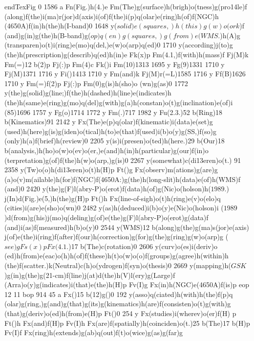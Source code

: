 {{{{{{{{{{{{{{{{{{{{{{{{{{{ endTexFig
 0 1586 a Fn(Fig.)h(4.{)e Fm(The)g(surface)h(brigh)o(tness)g(pro\014le)f
(along)f(the)i(ma)r(jor)d(axis)i(of)f(the)i(p)q(olar)e(ring)h(of)f(NGC)h
(4650A)f(in)h(the)h(I-band)0 1648 y(\(solid)e(squares,)h(this)g(w)o(ork\))f
(and)g(in)g(the)h(B-band)g(\(op)q(en)g(squares,)g(from)e(WMS\).)h(A)g
(transparen)o(t)i(ring)e(mo)q(del,)e(w)o(arp)q(ed)0 1710 y(according)j(to)g
(the)h(prescription)g(describ)q(ed)h(in)e Fk(x)p Fm(4.1,)f(with)h(mass)f
Fj(M)k Fm(=)12 b(2)p Fj(:)p Fm(4)c Fk()i Fm(10)1313 1695
y Fg(9)1331 1710 y Fj(M)1371 1716 y Fi()1413 1710 y Fm(and)k
Fj(M)r(=L)1585 1716 y Ff(B)1626 1710 y Fm(=)f(2)p Fj(:)p Fm(0)g(is)h(sho)o
(wn)g(as)0 1772 y(the)g(solid)g(line;)f(the)h(dashed)h(line)e(indicates)h
(the)h(same)e(ring)g(mo)q(del)g(with)g(a)h(constan)o(t)g(inclination)e(of)i
(85)1696 1757 y Fg(o)1714 1772 y Fm(.)717 1982 y Fu(2.3.)52
b(Ring)18 b(Kinematics)91 2142 y Fx(The)e(p)q(olar)f(kinematic)i(data)e(set)g
(used)h(here)g(is)g(iden)o(tical)h(to)e(that)f(used)i(b)o(y)g(SS,)f(so)g
(only)h(a)f(brief)h(review)0 2205 y(is)i(presen)o(ted)h(here.)29
b(Our)18 b(analysis,)h(ho)o(w)o(ev)o(er,)e(and)h(in)h(particular)g(our)f(in)o
(terpretation)g(of)f(the)h(w)o(arp,)g(is)0 2267 y(somewhat)c(di\013eren)o(t.)
91 2358 y(Tw)o(o)h(di\013eren)o(t)h(H)p Ft()g Fx(observ)m(ations)g(are)g
(a)o(v)m(ailable)h(for)f(NGC)f(4650A:)g(the)h(long-slit)h(data)e(of)h(WMS)f
(and)0 2420 y(the)g(F)l(abry-P)o(erot)f(data)h(of)g(Nic)o(holson)h(\(1989\).)
j(In)d(Fig.)e(5,)h(the)g(H)p Ft()h Fx(line-of-sigh)o(t)h(ring)e(v)o(elo)q
(cities)i(are)e(sho)o(wn)0 2482 y(as)h(deduced)i(b)o(y)e(Nic)o(holson)i
(\(1989\))d(from)g(his)j(mo)q(deling)g(of)e(the)g(F)l(abry-P)o(erot)g(data)f
(and)i(as)f(measured)h(b)o(y)0 2544 y(WMS)12 b(along)g(the)g(ma)s(jor)e(axis)
j(of)e(the)i(ring)f(after)f(our)h(correction)g(for)g(the)g(ring)g(w)o(arp)g
(\(see)g Fs(x)p Fx(4.1\).)17 b(The)c(rotation)0 2606 y(curv)o(es)i(deriv)o
(ed)h(from)e(eac)o(h)h(of)f(these)h(t)o(w)o(o)f(groups)g(agree)h(within)h
(the)f(scatter.)k(Neutral)c(h)o(ydrogen)f(syn)o(thesis)0 2669
y(mapping)h(\(GSK\))g(in)g(the)g(21-cm)f(line)j(at)d(the)h(V)l(ery)g(Large)f
(Arra)o(y)g(indicates)i(that)e(the)h(H)p Fv(I)g Fx(in)h(NGC)e(4650A)f(is)p
eop
12 11 bop 914 45 a Fx({)15 b(12)g({)0 192 y(asso)q(ciated)h(with)h(the)f(p)q
(olar)g(ring,)g(and)g(that)g(its)g(kinematics)h(are)f(consisten)o(t)g(with)g
(that)g(deriv)o(ed)h(from)e(H)p Ft()0 254 y Fx(studies)i(wherev)o(er)f(H)
p Ft()h Fx(and)f(H)p Fv(I)h Fx(are)f(spatially)h(coinciden)o(t.)25
b(The)17 b(H)p Fv(I)f Fx(ring)h(extends)g(ab)q(out)f(t)o(wice)g(as)g(far)g
}}}}}}}}}}}}}}}}}}}}}}}}}}}}}}
